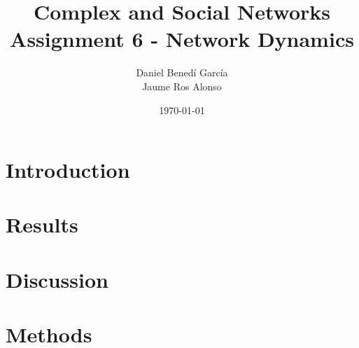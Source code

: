\documentclass{article}
\title{Complex and Social Networks \\ Assignment 6 - Network Dynamics}
\author{Daniel Benedí García\\ Jaume Ros Alonso}
\date{\monthyeardate\today}
\begin{document}
\maketitle
\begin{multicols}{2}
\tableofcontents
\end{multicols}

\section{Introduction}
\label{sec:introduction}


\newpage
\section{Results}
\label{sec:results}


\newpage
\section{Discussion}
\label{sec:discussion}


\newpage
\section{Methods}
\label{sec:methods}


\newpage
{}
\printbibliography

\newpage
\appendix
\label{appendix:cc}

\end{document}
